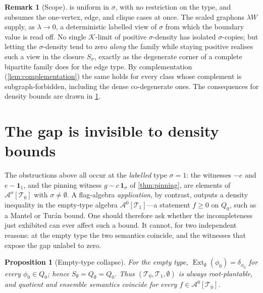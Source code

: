 \documentclass[11pt]{article}
\newtheorem{proposition}[theorem]{Proposition}
\theoremstyle{definition}
\newtheorem{remark}[theorem]{Remark}
\newcommand{\A}{\mathcal{A}}
\newcommand{\K}{\mathcal{K}}
\newcommand{\T}{\mathcal{T}}
\newcommand{\Ext}{\operatorname{Ext}}
\newcommand{\one}{\mathbf 1}
\begin{document}
\begin{remark}[Scope]
 is uniform in $\sigma$, with no restriction on the type, and
subsumes the one-vertex, edge, and clique cases at once.  The scaled graphons
$\lambda W$ supply, as $\lambda\to0$, a deterministic labelled view of $\sigma$ from which
the boundary value is read off.  No single $\K$-limit of positive $\sigma$-density has
isolated $\sigma$-copies; but letting the $\sigma$-density tend to zero \emph{along} the
family while staying positive realises such a view in the closure $S_\sigma$, exactly as
the degenerate corner of a complete bipartite family does for the edge type.  By
complementation (\cref{lem:complementation}) the same holds for every class whose
complement is subgraph-forbidden, including the dense co-degenerate ones.  The
consequences for density bounds are drawn in \cref{sec:empty-type}.
\end{remark}

\section{The gap is invisible to density bounds}\label{sec:empty-type}

The obstructions above all occur at the \emph{labelled} type $\sigma=1$: the witnesses
$-e$ and $e-\one_1$, and the pinning witness $g-c\,\one_\sigma$ of
\cref{thm:pinning}, are elements of $\A^\sigma[\T_0]$ with $\sigma\ne\emptyset$.  A
flag-algebra \emph{application}, by contrast, outputs a density inequality in the
empty-type algebra $\A^0[\T_1]$---a statement $f\ge0$ on $Q_0$, such as a Mantel or
Tur\'an bound.  One should therefore ask whether the incompleteness just exhibited can
ever affect such a bound.  It cannot, for two independent reasons: at the empty type the
two semantics coincide, and the witnesses that expose the gap unlabel to zero.

\begin{proposition}[Empty-type collapse]\label{prop:empty-type}
For the empty type, $\Ext_\emptyset(\phi_0)=\delta_{\phi_0}$ for every $\phi_0\in Q_0$;
hence $S_\emptyset=Q_\emptyset=Q_0$.  Thus $(\T_0,\T_1,\emptyset)$ is always
root-plantable, and quotient and ensemble semantics coincide for every $f\in\A^0[\T_0]$.
\end{proposition}
\end{document}
